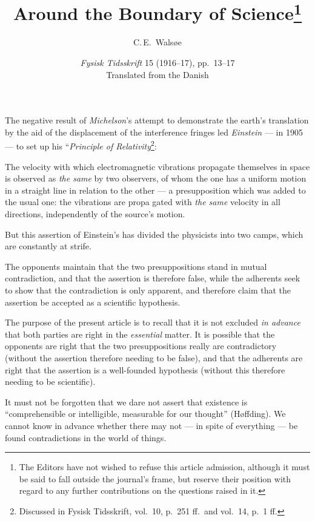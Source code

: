 \documentclass[12pt,a4paper]{article}
\title{\textbf{Around the Boundary of Science\footnote{The Editors have not wished to refuse this article admission, although it must be said to fall outside the journal's frame, but reserve their position with regard to any further contributions on the questions raised in it.}}}
\author{C.\,E.\ Walsøe}
\date{\textit{Fysisk Tidsskrift} 15 (1916--17), pp.~13--17\\[2pt]
\small Translated from the Danish}
\begin{document}
\maketitle

\setcounter{footnote}{1}%

The negative result of \emph{Michelson}'s attempt to demonstrate the earth's
translation by the aid of the displacement of the interference fringes led
\emph{Einstein} --- in 1905 --- to set up his
``\emph{Principle of Relativity}\footnote{Discussed in Fysisk Tidsskrift,
vol.\ 10, p.\ 251 ff.\ and vol.\ 14, p.\ 1 ff.}:

The velocity with which electromagnetic vibrations propagate themselves in
space is observed as \emph{the same} by two observers, of whom the one has a
uniform motion in a straight line in relation to the other --- a presupposition
which was added to the usual one: the vibrations are propa\-%
gated with \emph{the same} velocity in all directions, independently of the
source's motion.

But this assertion of Einstein's has divided the physicists into two camps,
which are constantly at strife.

The opponents maintain that the two presuppositions stand in mutual
contradiction, and that the assertion is therefore false, while the adherents
seek to show that the contradiction is only apparent, and therefore claim that
the assertion be accepted as a scientific hypothesis.

The purpose of the present article is to recall that it is not excluded
\emph{in advance} that both parties are right in the \emph{essential} matter.
It is possible that the opponents are right that the two presuppositions
really are contradictory (without the assertion therefore needing to be
false), and that the adherents are right that the assertion is a well-founded
hypothesis (without this therefore needing to be scientific).

It must not be forgotten that we dare not assert that existence is
``comprehensible or intelligible, measurable for our thought'' (Høffding). We
cannot know in advance whether there may not --- in spite of everything ---
be found contradictions in the world of things.
\end{document}

